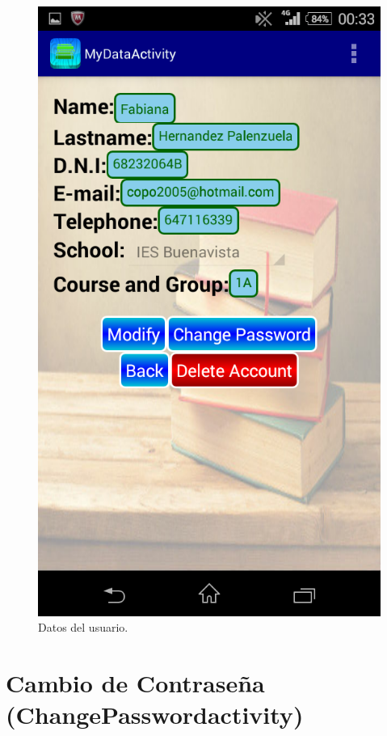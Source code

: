 		\begin{figure}[h !]
			\centering
			\includegraphics[scale=0.3]{Imagenes/App/myData}
			\caption{Datos del usuario.}
			\label{fig:myData}
		\end{figure}
	
	\section{Cambio de Contraseña ({\ttfamily ChangePasswordactivity})} \label{sec:changePassword}
	
